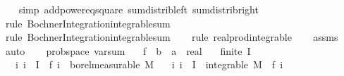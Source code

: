 \begin{isabellebody}
%
\isadelimproof
\ \ %
\endisadelimproof
%
\isatagproof
{}\isamarkupfalse%
\ {\isacharparenleft}{\kern0pt}simp\ add{\isacharcolon}{\kern0pt}power{}{\isacharunderscore}{\kern0pt}eq{\isacharunderscore}{\kern0pt}square\ sum{\isacharunderscore}{\kern0pt}distrib{\isacharunderscore}{\kern0pt}left\ sum{\isacharunderscore}{\kern0pt}distrib{\isacharunderscore}{\kern0pt}right{\isacharparenright}{\kern0pt}\isanewline
\ \ \isamarkupfalse%
\ {\isacharparenleft}{\kern0pt}rule\ Bochner{\isacharunderscore}{\kern0pt}Integration{\isachardot}{\kern0pt}integrable{\isacharunderscore}{\kern0pt}sum{\isacharparenright}{\kern0pt}\isanewline
\ \ \isamarkupfalse%
\ {\isacharparenleft}{\kern0pt}rule\ Bochner{\isacharunderscore}{\kern0pt}Integration{\isachardot}{\kern0pt}integrable{\isacharunderscore}{\kern0pt}sum{\isacharparenright}{\kern0pt}\isanewline
\ \ \isamarkupfalse%
\ {\isacharparenleft}{\kern0pt}rule\ real{\isacharunderscore}{\kern0pt}prod{\isacharunderscore}{\kern0pt}integrable{\isacharparenright}{\kern0pt}\isanewline
\ \ \isamarkupfalse%
\ assms\ \isamarkupfalse%
\ auto%
\endisatagproof
{\isafoldproof}%
%
\isadelimproof
\ \isanewline
%
\endisadelimproof
\isanewline
{}\isamarkupfalse%
\ {\isacharparenleft}{\kern0pt}\ prob{\isacharunderscore}{\kern0pt}space{\isacharparenright}{\kern0pt}\ var{\isacharunderscore}{\kern0pt}sum{\isacharunderscore}{\kern0pt}{}{\isacharcolon}{\kern0pt}\isanewline
\ \ \ f\ {\isacharcolon}{\kern0pt}{\isacharcolon}{\kern0pt}\ {\isachardoublequoteopen}{\isacharprime}{\kern0pt}b\ {\isasymRightarrow}\ {\isacharprime}{\kern0pt}a\ {\isasymRightarrow}\ real{\isachardoublequoteclose}\isanewline
\ \ \ {\isachardoublequoteopen}finite\ I{\isachardoublequoteclose}\isanewline
\ \ \ {\isachardoublequoteopen}{\isasymAnd}i{\isachardot}{\kern0pt}\ i\ {\isasymin}\ I\ {\isasymLongrightarrow}\ f\ i\ {\isasymin}\ borel{\isacharunderscore}{\kern0pt}measurable\ M{\isachardoublequoteclose}\isanewline
\ \ \ {\isachardoublequoteopen}{\isasymAnd}i{\isachardot}{\kern0pt}\ i\ {\isasymin}\ I\ {\isasymLongrightarrow}\ integrable\ M\ {\isacharparenleft}{\kern0pt}{\isasymlambda}{\isasymomega}{\isachardot}{\kern0pt}\ f\ i\ {\isasymomega}{\isacharcircum}{\kern0pt}{}{\isacharparenright}{\kern0pt}{\isachardoublequoteclose}\isanewline
\ \ \ \isanewline

\end{isabellebody}
